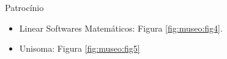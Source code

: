 \begin{frame}{Patrocínio}  %

\begin{figure}[ht]
   \centering
  \hspace{0.1\linewidth}
\end{figure}
	\begin{itemize}
	\item Linear Softwares Matemáticos: Figura \ref{fig:museo:fig4}.
	\item Unisoma: Figura \ref{fig:museo:fig5}
	\end{itemize}
\end{frame}	
